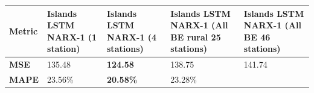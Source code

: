 \documentclass[11pt]{article}
\begin{document}
\begin{longtable}[]{@{}lllll@{}}
\toprule
\begin{minipage}[b]{0.17\columnwidth}\raggedright
Metric\strut
\end{minipage} & \begin{minipage}[b]{0.17\columnwidth}\raggedright
Islands LSTM NARX-1 (1 station)\strut
\end{minipage} & \begin{minipage}[b]{0.17\columnwidth}\raggedright
Islands LSTM NARX-1 (4 stations)\strut
\end{minipage} & \begin{minipage}[b]{0.17\columnwidth}\raggedright
Islands LSTM NARX-1 (All BE rural 25 stations)\strut
\end{minipage} & \begin{minipage}[b]{0.17\columnwidth}\raggedright
Islands LSTM NARX-1 (All BE 46 stations)\strut
\end{minipage}\tabularnewline
\midrule
\endhead
\begin{minipage}[t]{0.17\columnwidth}\raggedright
\textbf{MSE}\strut
\end{minipage} & \begin{minipage}[t]{0.17\columnwidth}\raggedright
135.48\strut
\end{minipage} & \begin{minipage}[t]{0.17\columnwidth}\raggedright
\textbf{124.58}\strut
\end{minipage} & \begin{minipage}[t]{0.17\columnwidth}\raggedright
138.75\strut
\end{minipage} & \begin{minipage}[t]{0.17\columnwidth}\raggedright
141.74\strut
\end{minipage}\tabularnewline
\begin{minipage}[t]{0.17\columnwidth}\raggedright
\textbf{MAPE}\strut
\end{minipage} & \begin{minipage}[t]{0.17\columnwidth}\raggedright
23.56\%\strut
\end{minipage} & \begin{minipage}[t]{0.17\columnwidth}\raggedright
\textbf{20.58\%}\strut
\end{minipage} & \begin{minipage}[t]{0.17\columnwidth}\raggedright
23.28\%\strut
\end{minipage} & \begin{minipage}[t]{0.17\columnwidth}\raggedright

\end{minipage}
\end{longtable}
\end{document}
